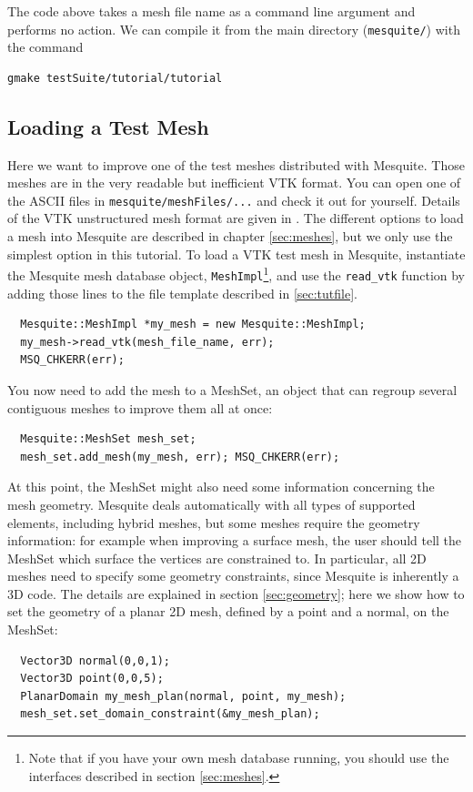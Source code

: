 \documentclass[letter]{report}
\begin{document}
The code above takes a mesh file name as a command line argument and performs no action. 
We can compile it from the main directory
(\texttt{mesquite/}) with the command 
\begin{verbatim}
gmake testSuite/tutorial/tutorial
\end{verbatim}

\subsection{Loading a Test Mesh}
\label{sec:tutMesh}
Here we want to improve one of the test meshes distributed with Mesquite. Those meshes are in
the very readable but inefficient VTK format. You can open one of the ASCII files in
\texttt{mesquite/meshFiles/...} and check it out for yourself. Details of the VTK unstructured mesh 
format are given in \cite{VTKbook, VTKuml}. The different options to load a mesh into Mesquite are 
described in chapter \ref{sec:meshes}, but we only use the simplest option in this tutorial.
To load a VTK test mesh in Mesquite, instantiate the Mesquite mesh database object,
\texttt{MeshImpl}\footnote{Note that if you have your own mesh
database running, you should use the interfaces described in section \ref{sec:meshes}.}, 
and use the \texttt{read\_vtk} function by adding those lines to the file
template described in \ref{sec:tutfile}.
\begin{verbatim}
  Mesquite::MeshImpl *my_mesh = new Mesquite::MeshImpl;
  my_mesh->read_vtk(mesh_file_name, err); 
  MSQ_CHKERR(err);
\end{verbatim}
You now need to add the mesh to a MeshSet, an object that can regroup several contiguous meshes to
improve them all at once:
\begin{verbatim}
  Mesquite::MeshSet mesh_set;
  mesh_set.add_mesh(my_mesh, err); MSQ_CHKERR(err);
\end{verbatim}
At this point, the MeshSet might also need some information concerning the mesh geometry. Mesquite
deals automatically with all types of supported elements, including hybrid meshes, but some meshes
require the geometry information: for example when improving a surface mesh, the user should tell
the MeshSet which surface the vertices are constrained to. In particular, all 2D meshes need to
specify some geometry constraints, since Mesquite is inherently a 3D code. 
The details are explained in section
\ref{sec:geometry}; here we show how to set the geometry of a planar 2D mesh, defined by a point and
a normal, on the MeshSet: 
\begin{verbatim}
  Vector3D normal(0,0,1);
  Vector3D point(0,0,5);
  PlanarDomain my_mesh_plan(normal, point, my_mesh);
  mesh_set.set_domain_constraint(&my_mesh_plan);
\end{verbatim}
\end{document}
